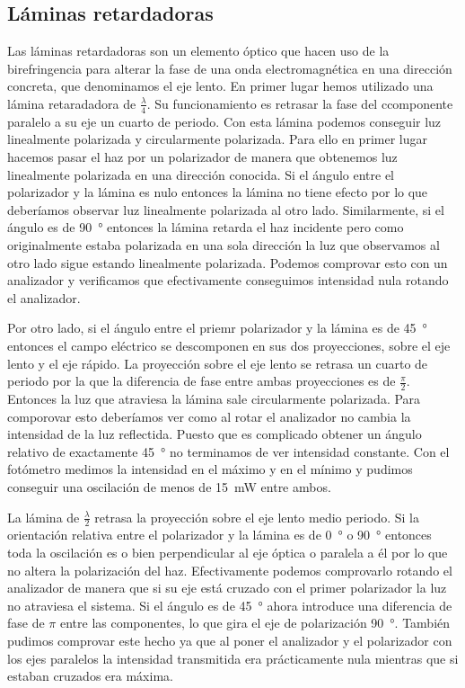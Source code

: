 \documentclass[12pt]{article}
\numberwithin{table}{section}
\numberwithin{figure}{section}
\numberwithin{equation}{section}
\begin{document}
\subsection{Láminas retardadoras}
Las láminas retardadoras son un elemento óptico que hacen uso de la birefringencia para alterar la fase de una onda electromagnética en una dirección concreta, que denominamos el eje lento. En primer lugar hemos utilizado una lámina retaradadora de \( \frac{\lambda}{4} \). Su funcionamiento es retrasar la fase del ccomponente paralelo a su eje un cuarto de periodo. Con esta lámina podemos conseguir luz linealmente polarizada y circularmente polarizada. Para ello en primer lugar hacemos pasar el haz por un polarizador de manera que obtenemos luz linealmente polarizada en una dirección conocida. Si el ángulo entre el polarizador y la lámina es nulo entonces la lámina no tiene efecto por lo que deberíamos observar luz linealmente polarizada al otro lado. Similarmente, si el ángulo es de \SI{90}{\degree} entonces la lámina retarda el haz incidente pero como originalmente estaba polarizada en una sola dirección la luz que observamos al otro lado sigue estando linealmente polarizada. Podemos comprovar esto con un analizador y verificamos que efectivamente conseguimos intensidad nula rotando el analizador. 

Por otro lado, si el ángulo entre el priemr polarizador y la lámina es de \SI{45}{\degree} entonces el campo eléctrico se descomponen en sus dos proyecciones, sobre el eje lento y el eje rápido. La proyección sobre el eje lento se retrasa un cuarto de periodo por la que la diferencia de fase entre ambas proyecciones es de \( \frac{\pi}{2} \). Entonces la luz que atraviesa la lámina sale circularmente polarizada. Para comporovar esto deberíamos ver como al rotar el analizador no cambia la intensidad de la luz reflectida. Puesto que es complicado obtener un ángulo relativo de exactamente \SI{45}{\degree} no terminamos de ver intensidad constante. Con el fotómetro medimos la intensidad en el máximo y en el mínimo y pudimos conseguir una oscilación de menos de \SI{15}{mW} entre ambos.  

La lámina de \( \frac{\lambda}{2} \) retrasa la proyección sobre el eje lento medio periodo. Si la orientación relativa entre el polarizador y la lámina es de \SI{0}{\degree} o \SI{90}{\degree} entonces toda la oscilación es o bien perpendicular al eje óptica o paralela a él por lo que no altera la polarización del haz. Efectivamente podemos comprovarlo rotando el analizador de manera que si su eje está cruzado con el primer polarizador la luz no atraviesa el sistema. Si el ángulo es de \SI{45}{\degree} ahora introduce una diferencia de fase de \( \pi \) entre las componentes, lo que gira el eje de polarización \SI{90}{\degree}. También pudimos comprovar este hecho ya que al poner el analizador y el polarizador con los ejes paralelos la intensidad transmitida era prácticamente nula mientras que si estaban cruzados era máxima.
\end{document}
